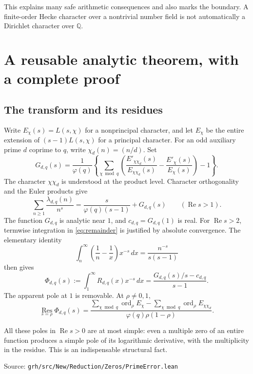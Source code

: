 \documentclass[11pt,letterpaper]{article}
\theoremstyle{definition}
\theoremstyle{remark}
\newcommand{\Q}{\mathbb Q}
\newcommand{\Rea}{\operatorname{Re}}
\newcommand{\ord}{\operatorname{ord}}
\newcommand{\src}[1]{\par{\small\color{navy}Source: \nolinkurl{grh/src/#1}}\par}
\begin{document}
This explains many safe arithmetic consequences and also marks the
boundary. A finite-order Hecke character over a nontrivial number field
is not automatically a Dirichlet character over \(\Q\).

\section{A reusable analytic theorem, with a complete proof}
\label{sec:analytic}

\subsection{The transform and its residues}

Write \(E_\chi(s)=L(s,\chi)\) for a nonprincipal character, and let
\(E_\chi\) be the entire extension of \((s-1)L(s,\chi)\) for a principal
character. For an odd auxiliary prime \(d\) coprime to \(q\), write
\(\chi_d(n)=(n/d)\). Set
\[
 G_{d,q}(s)=\frac1{\varphi(q)}
 \left\{\sum_{\chi\bmod q}
 \left(\frac{E'_{\chi\chi_d}(s)}{E_{\chi\chi_d}(s)}
       -\frac{E'_\chi(s)}{E_\chi(s)}\right)-1\right\}.
\]
The character \(\chi\chi_d\) is understood at the product level.
Character orthogonality and the Euler products give
\[
 \sum_{n\ge1}\frac{\lambda_{d,q}(n)}{n^s}
 =\frac{s}{\varphi(q)(s-1)}+G_{d,q}(s)\qquad(\Rea s>1).
\]
The function \(G_{d,q}\) is analytic near \(1\), and
\(c_{d,q}=G_{d,q}(1)\) is real. For \(\Rea s>2\), termwise integration
in \eqref{eq:remainder} is justified by absolute convergence. The
elementary identity
\[
 \int_n^\infty\left(\frac1n-\frac1x\right)x^{-s}\,dx
 =\frac{n^{-s}}{s(s-1)}
\]
then gives
\begin{equation}\label{eq:transform}
 \Phi_{d,q}(s):=\int_1^\infty R_{d,q}(x)x^{-s}\,dx
 =\frac{G_{d,q}(s)/s-c_{d,q}}{s-1}.
\end{equation}
The apparent pole at \(1\) is removable. At \(\rho\ne0,1\),
\begin{equation}\label{eq:residues}
 \operatorname*{Res}_{s=\rho}\Phi_{d,q}(s)=
 \frac{\displaystyle\sum_{\chi\bmod q}\ord_\rho E_\chi
 -\displaystyle\sum_{\chi\bmod q}\ord_\rho E_{\chi\chi_d}}
 {\varphi(q)\rho(1-\rho)}.
\end{equation}

All these poles in \(\Rea s>0\) are at most simple: even a multiple zero of an entire
function produces a simple pole of its logarithmic derivative, with the
multiplicity in the residue. This is an indispensable structural fact.
\src{New/Reduction/Zeros/PrimeError.lean}
\end{document}
